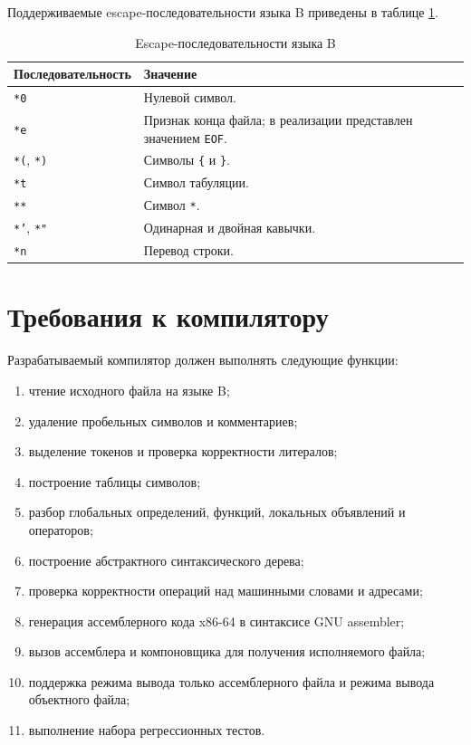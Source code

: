 Поддерживаемые escape-последовательности языка B приведены в таблице \ref{tbl:escapes}.

\begin{longtable}{|p{4cm}|p{12cm}|}
  \caption{Escape-последовательности языка B}
  \label{tbl:escapes} \\
  \hline
  \textbf{Последовательность} & \textbf{Значение} \\
  \hline
  \texttt{*0} & Нулевой символ. \\
  \hline
  \texttt{*e} & Признак конца файла; в реализации представлен значением \texttt{EOF}. \\
  \hline
  \texttt{*(}, \texttt{*)} & Символы \texttt{\{} и \texttt{\}}. \\
  \hline
  \texttt{*t} & Символ табуляции. \\
  \hline
  \texttt{**} & Символ \texttt{*}. \\
  \hline
  \texttt{*'}, \texttt{*"} & Одинарная и двойная кавычки. \\
  \hline
  \texttt{*n} & Перевод строки. \\
  \hline
\end{longtable}

\section{Требования к компилятору}

Разрабатываемый компилятор должен выполнять следующие функции:

\begin{enumerate}
  \item чтение исходного файла на языке B;
  \item удаление пробельных символов и комментариев;
  \item выделение токенов и проверка корректности литералов;
  \item построение таблицы символов;
  \item разбор глобальных определений, функций, локальных объявлений и операторов;
  \item построение абстрактного синтаксического дерева;
  \item проверка корректности операций над машинными словами и адресами;
  \item генерация ассемблерного кода x86-64 в синтаксисе GNU assembler;
  \item вызов ассемблера и компоновщика для получения исполняемого файла;
  \item поддержка режима вывода только ассемблерного файла и режима вывода объектного файла;
  \item выполнение набора регрессионных тестов.
\end{enumerate}

